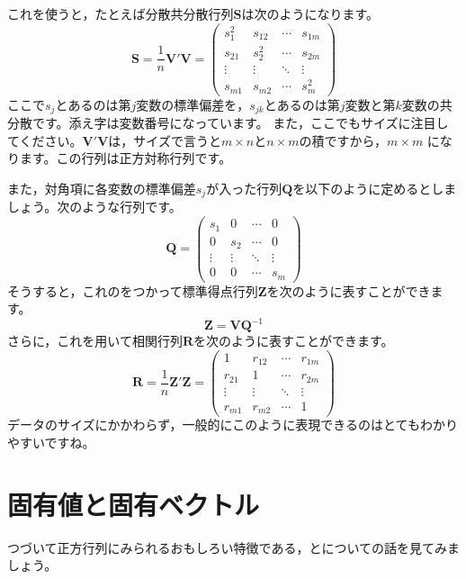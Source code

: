 \documentclass{ltjsbook}
\begin{document}
これを使うと，たとえば分散共分散行列$\bm{S}$は次のようになります。
\[ \bm{S} = \frac{1}{n} \bm{V}' \bm{V} = \begin{pmatrix}
        s_1^2  & s_{12} & \cdots & s_{1m} \\
        s_{21} & s_2^2  & \cdots & s_{2m} \\
        \vdots & \vdots & \ddots & \vdots \\
        s_{m1} & s_{m2} & \cdots & s_m^2\end{pmatrix} \]
ここで$s_j$とあるのは第$j$変数の標準偏差を，$s_{jk}$とあるのは第$j$変数と第$k$変数の共分散です。添え字は変数番号になっています。
また，ここでもサイズに注目してください。$\bm{V}'\bm{V}$は，サイズで言うと$m \times n$と$n \times m$の積ですから，$m \times m$ になります。この行列は正方対称行列です。

また，対角項に各変数の標準偏差$s_j$が入った行列$\bm{Q}$を以下のように定めるとしましょう。次のような行列です。
\[ \bm{Q} = \begin{pmatrix} s_1    & 0      & \cdots & 0      \\
                0      & s_2    & \cdots & 0      \\
                \vdots & \vdots & \ddots & \vdots \\
                0      & 0      & \cdots & s_m\end{pmatrix} \]
そうすると，これのをつかって標準得点行列$\bm{Z}$を次のように表すことができます。
\[ \bm{Z} = \bm{V} \bm{Q}^{-1} \]
さらに，これを用いて相関行列$\bm{R}$を次のように表すことができます。
\[ \bm{R} = \frac{1}{n}\bm{Z}' \bm{Z} = \begin{pmatrix} 1      & r_{12} & \cdots & r_{1m} \\
                r_{21} & 1      & \cdots & r_{2m} \\
                \vdots & \vdots & \ddots & \vdots \\
                r_{m1} & r_{m2} & \cdots & 1\end{pmatrix} \]
データのサイズにかかわらず，一般的にこのように表現できるのはとてもわかりやすいですね。


\section{固有値と固有ベクトル}
つづいて正方行列にみられるおもしろい特徴である，とについての話を見てみましょう。
\end{document}

